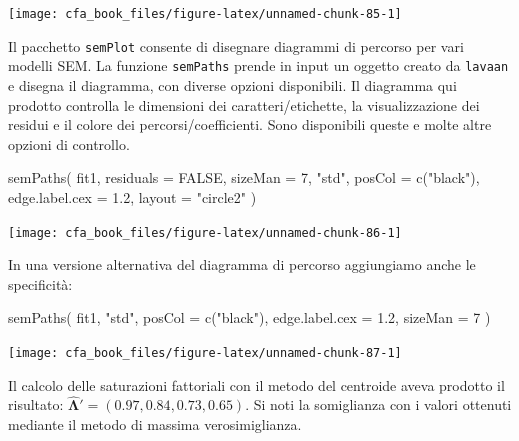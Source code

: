\documentclass[
  11pt,
]{krantz}
\makeatletter
\newenvironment{Shaded}{\begin{snugshade}}{\end{snugshade}}
\newcommand{\AttributeTok}[1]{\textcolor[rgb]{0.61,0.61,0.61}{#1}}
\newcommand{\ConstantTok}[1]{\textcolor[rgb]{0,0,0}{#1}}
\newcommand{\DecValTok}[1]{\textcolor[rgb]{0.06,0.06,0.06}{#1}}
\newcommand{\FloatTok}[1]{\textcolor[rgb]{0.06,0.06,0.06}{#1}}
\newcommand{\FunctionTok}[1]{\textcolor[rgb]{0,0,0}{#1}}
\newcommand{\NormalTok}[1]{#1}
\newcommand{\StringTok}[1]{\textcolor[rgb]{0.5,0.5,0.5}{#1}}
\newenvironment{kframe}{%
\medskip{}
\setlength{\fboxsep}{.8em}
 \def\at@end@of@kframe{}%
 \ifinner\ifhmode%
  \def\at@end@of@kframe{\end{minipage}}%
  \begin{minipage}{\columnwidth}%
 \fi\fi%
 \def\FrameCommand##1{\hskip\@totalleftmargin \hskip-\fboxsep
 \colorbox{shadecolor}{##1}\hskip-\fboxsep
     \hskip-\linewidth \hskip-\@totalleftmargin \hskip\columnwidth}%
 \MakeFramed {\advance\hsize-\width
   \@totalleftmargin\z@ \linewidth\hsize
   \@setminipage}}%
 {\par\unskip\endMakeFramed%
 \at@end@of@kframe}
\renewenvironment{Shaded}{\begin{kframe}}{\end{kframe}}
\theoremstyle{definition}
\theoremstyle{definition}
\theoremstyle{definition}
\theoremstyle{definition}
\theoremstyle{remark}
\makeatother
\begin{document}
\begin{center}\texttt{[image: cfa\_book\_files/figure-latex/unnamed-chunk-85-1]} \end{center}

Il pacchetto \texttt{semPlot} consente di disegnare diagrammi di percorso per vari modelli SEM. La funzione \texttt{semPaths} prende in input un oggetto creato da \texttt{lavaan} e disegna il diagramma, con diverse opzioni disponibili. Il diagramma qui prodotto controlla le dimensioni dei caratteri/etichette, la visualizzazione dei residui e il colore dei percorsi/coefficienti. Sono disponibili queste e molte altre opzioni di controllo.

\begin{Shaded}
\begin{Highlighting}[]
\FunctionTok{semPaths}\NormalTok{(}
\NormalTok{  fit1,}
  \AttributeTok{residuals =} \ConstantTok{FALSE}\NormalTok{,}
  \AttributeTok{sizeMan =} \DecValTok{7}\NormalTok{,}
  \StringTok{"std"}\NormalTok{,}
  \AttributeTok{posCol =} \FunctionTok{c}\NormalTok{(}\StringTok{"black"}\NormalTok{),}
  \AttributeTok{edge.label.cex =} \FloatTok{1.2}\NormalTok{,}
  \AttributeTok{layout =} \StringTok{"circle2"}
\NormalTok{)}
\end{Highlighting}
\end{Shaded}

\begin{center}\texttt{[image: cfa\_book\_files/figure-latex/unnamed-chunk-86-1]} \end{center}

In una versione alternativa del diagramma di percorso aggiungiamo anche le specificità:

\begin{Shaded}
\begin{Highlighting}[]
\FunctionTok{semPaths}\NormalTok{(}
\NormalTok{  fit1,}
  \StringTok{"std"}\NormalTok{,}
  \AttributeTok{posCol =} \FunctionTok{c}\NormalTok{(}\StringTok{"black"}\NormalTok{),}
  \AttributeTok{edge.label.cex =} \FloatTok{1.2}\NormalTok{,}
  \AttributeTok{sizeMan =} \DecValTok{7}
\NormalTok{)}
\end{Highlighting}
\end{Shaded}

\begin{center}\texttt{[image: cfa\_book\_files/figure-latex/unnamed-chunk-87-1]} \end{center}

Il calcolo delle saturazioni fattoriali con il metodo del centroide aveva prodotto il risultato: \(\boldsymbol{\hat{\Lambda}}'= (0.97, 0.84, 0.73, 0.65)\). Si noti la somiglianza con i valori ottenuti mediante il metodo di massima verosimiglianza.
\end{document}
